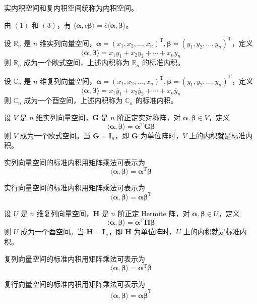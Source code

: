 \begin{remark}
    实内积空间和复内积空间统称为内积空间。
\end{remark}

\begin{remark}
    由 $(1)$ 和 $(3)$，有 $\langle \bm{\alpha}, c\bm{\beta} \rangle = \overline{c}\langle \bm{\alpha}, \bm{\beta} \rangle$。
\end{remark}

\begin{definition}
    设 $\mathbb{R}_n$ 是 $n$ 维实列向量空间，$\bm{\alpha} = (x_1, x_2, \ldots, x_n)^{\mathrm{T}}, \bm{\beta} = (y_1, y_2, \ldots, y_n)^{\mathrm{T}}$，定义
    \[
        \langle \bm{\alpha}, \bm{\beta} \rangle = x_{1}y_{1} + x_{2}y_{2} + \cdots + x_{n}y_{n}
    \]
    则 $\mathbb{R}_n$ 成为一个欧式空间，上述内积称为 $\mathbb{R}_n$ 的标准内积。
\end{definition}

\begin{definition}
    设 $\mathbb{C}_n$ 是 $n$ 维复列向量空间，$\bm{\alpha} = (x_1, x_2, \ldots, x_n)^{\mathrm{T}}, \bm{\beta} = (y_1, y_2, \ldots, y_n)^{\mathrm{T}}$，定义
    \[
        \langle \bm{\alpha}, \bm{\beta} \rangle = x_{1}\overline{y}_{1} + x_{2}\overline{y}_{2} + \cdots + x_{n}\overline{y}_{n}
    \]
    则 $\mathbb{C}_n$ 成为一个酉空间，上述内积称为 $\mathbb{C}_n$ 的标准内积。
\end{definition}

\begin{proposition}
    设 $V$ 是 $n$ 维实列向量空间，$\bm{G}$ 是 $n$ 阶正定实对称阵，对 $\bm{\alpha}, \bm{\beta} \in V$，定义
    \[
        \langle \bm{\alpha}, \bm{\beta} \rangle = \bm{\alpha}^{\mathrm{T}}\bm{G\beta}
    \]
    则 $V$ 成为一个欧式空间。当 $\bm{G} = \bm{I}_n$，即 $\bm{G}$ 为单位阵时，$V$ 上的内积就是标准内积。

    实列向量空间的标准内积用矩阵乘法可表示为
    \[
        \langle \bm{\alpha}, \bm{\beta} \rangle = \bm{\alpha}^{\mathrm{T}}\bm{\beta}
    \]

    实行向量空间的标准内积用矩阵乘法可表示为
    \[
        \langle \bm{\alpha}, \bm{\beta} \rangle = \bm{\alpha}\bm{\beta}^{\mathrm{T}}
    \]
\end{proposition}

\begin{proposition}
    设 $U$ 是 $n$ 维复列向量空间，$\bm{H}$ 是 $n$ 阶正定 Hermite 阵，对 $\bm{\alpha}, \bm{\beta} \in U$，定义
    \[
        \langle \bm{\alpha}, \bm{\beta} \rangle = \bm{\alpha}^{\mathrm{T}}\bm{H}\overline{\bm{\beta}}
    \]
    则 $U$ 成为一个酉空间。当 $\bm{H} = \bm{I}_n$，即 $\bm{H}$ 为单位阵时，$U$ 上的内积就是标准内积。

    复列向量空间的标准内积用矩阵乘法可表示为
    \[
        \langle \bm{\alpha}, \bm{\beta} \rangle = \bm{\alpha}^{\mathrm{T}}\overline{\bm{\beta}}
    \]

    复行向量空间的标准内积用矩阵乘法可表示为
    \[
        \langle \bm{\alpha}, \bm{\beta} \rangle = \bm{\alpha}\overline{\bm{\beta}}^{\mathrm{T}}
    \]
\end{proposition}

